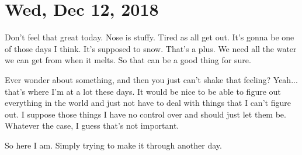 \section{Wed, Dec 12, 2018}

Don't feel that great today. Nose is stuffy. Tired as all get out. It's gonna be one
of those days I think. It's supposed to snow. That's a plus. We need all the water we
can get from when it melts. So that can be a good thing for sure.

Ever wonder about something, and then you just can't shake that feeling? Yeah...
that's where I'm at a lot these days. It would be nice to be able to figure out
everything in the world and just not have to deal with things that I can't figure
out. I suppose those things I have no control over and should just let them be.
Whatever the case, I guess that's not important.

So here I am. Simply trying to make it through another day.